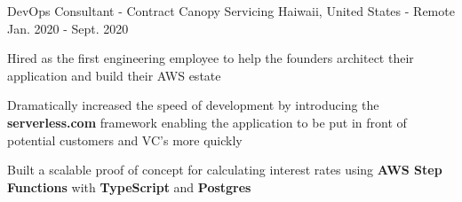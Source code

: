 \begin{cventries}
  \cventry
    {DevOps Consultant - Contract} %
    {Canopy Servicing} %
    {Haiwaii, United States - Remote} %
    {Jan. 2020 - Sept. 2020} %
    {
      \begin{cvitems} %
        \item {Hired as the first engineering employee to help the founders architect their application and build their AWS estate}
        \item {Dramatically increased the speed of development by introducing the \textbf{serverless.com} framework enabling the application to be put in front of potential customers and VC's more quickly}
        \item {Built a scalable proof of concept for calculating interest rates using \textbf{AWS Step Functions} with \textbf{TypeScript} and \textbf{Postgres}}
      \end{cvitems}
    }


\end{cventries}
